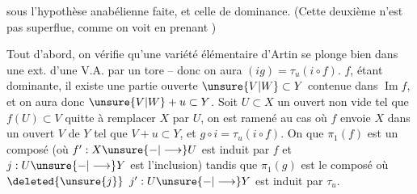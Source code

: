 sous l'hypothèse anabélienne faite, et celle de dominance. (Cette deuxième n'est pas superflue, comme on voit en prenant  )

Tout d'abord, on vérifie qu'une variété élémentaire d'Artin se plonge bien  dans une ext. d'une V.A. par un tore -- donc on aura $(ig)=\tau_u(i\circ f)$.    $f$, étant dominante, il existe une partie ouverte  $\unsure{V|W}\subset Y$ contenue dans $\operatorname{Im}f$, et on aura donc $\unsure{V|W}+u\subset Y$. Soit $U\subset X$ un ouvert non vide tel que $f(U)\subset V$   quitte à remplacer $X$ par $U$, on est ramené au cas où $f$ envoie $X$ dans un ouvert $V$ de $Y$ tel que $V+u\subset Y$, et $g\circ i=\tau_u(i\circ f)$. On   que $\pi_1(f)$ est un composé (où $f':X\unsure{-|\longrightarrow}U$ est  induit par $f$ et $j:U\unsure{-|\longrightarrow}Y$ est l'inclusion)
tandis que $\pi_1(g)$ est le composé
où $\deleted{\unsure{j}}$ $j':U\unsure{-|\longrightarrow}Y$ est induit par $\tau_u$.
